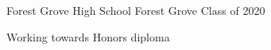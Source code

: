

\begin{cventries}

  \cventry
    {Forest Grove High School} %
    {Forest Grove} %
    {Class of 2020} %
    {
      \begin{cvitems} %
        \item {Working towards Honors diploma}
      \end{cvitems}
    }

\end{cventries}

